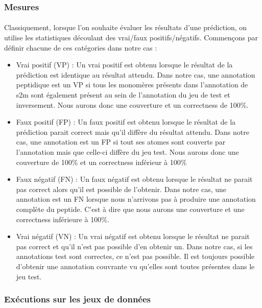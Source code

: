 \documentclass[12pt,french,twoside]{report}
\begin{document}
\subsubsection{Mesures}

\paragraph{}Classiquement, lorsque l'on souhaite évaluer les résultats d'une prédiction, on utilise les statistiques découlant des vrai/faux positifs/négatifs.
Commençons par définir chacune de ces catégories dans notre cas :
\begin{itemize}
 \item Vrai positif (VP) : Un vrai positif est obtenu lorsque le résultat de la prédiction est identique au résultat attendu.
Dans notre cas, une annotation peptidique est un VP si tous les monomères présents dans l'annotation de s2m sont également présent au sein de l'annotation du jeu de test et inversement.
Nous aurons donc une couverture et un correctness de 100\%.
 \item Faux positif (FP) : Un faux positif est obtenu lorsque le résultat de la prédiction parait correct mais qu'il diffère du résultat attendu.
Dans notre cas, une annotation est un FP si tout ses atomes sont couverts par l'annotation mais que celle-ci diffère du jeu test.
Nous aurons donc une couverture de 100\% et un correctness inférieur à 100\%
 \item Faux négatif (FN) : Un faux négatif est obtenu lorsque le résultat ne parait pas correct alors qu'il est possible de l'obtenir.
Dans notre cas, une annotation est un FN lorsque nous n'arrivons pas à produire une annotation complète du peptide.
C'est à dire que nous aurons une couverture et une correctness inférieure à 100\%.
 \item Vrai négatif (VN) : Un vrai négatif est obtenu lorsque le résultat ne parait pas correct et qu'il n'est pas possible d'en obtenir un.
Dans notre cas, si les annotations test sont correctes, ce n'est pas possible.
Il est toujours possible d'obtenir une annotation couvrante vu qu'elles sont toutes présentes dans le jeu test.
\end{itemize}


\subsubsection{Exécutions sur les jeux de données}

\label{resultats_s2m_p}
\end{document}
